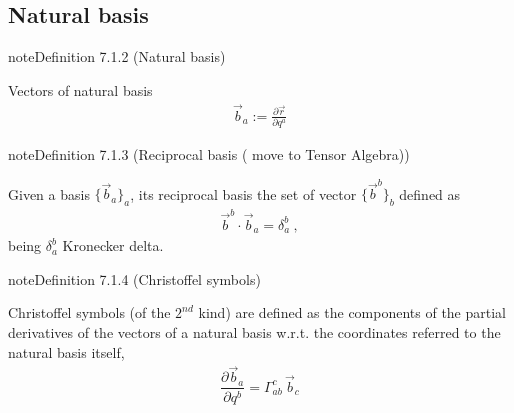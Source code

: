 \documentclass[letterpaper,10pt,english]{jupyterBook}
\begin{document}
\subsection{Natural basis}
\label{\detokenize{ch/tensor-algebra-calculus/calculus-euclidean:natural-basis}}\label{\detokenize{ch/tensor-algebra-calculus/calculus-euclidean:tensor-calculus-coordinates-natural-basis}}\label{ch/tensor-algebra-calculus/calculus-euclidean:definition-1}
\begin{sphinxadmonition}{note}{Definition 7.1.2 (Natural basis)}



\sphinxAtStartPar
Vectors of natural basis
\begin{equation*}
\begin{split}\vec{b}_a := \frac{\partial \vec{r}}{\partial q^a}\end{split}
\end{equation*}\end{sphinxadmonition}
\label{ch/tensor-algebra-calculus/calculus-euclidean:definition-2}
\begin{sphinxadmonition}{note}{Definition 7.1.3 (Reciprocal basis ( move to Tensor Algebra))}



\sphinxAtStartPar
Given a basis \(\{ \vec{b}_a \}_{a}\), its reciprocal basis the set of vector \(\{ \vec{b}^b \}_b\) defined as
\begin{equation*}
\begin{split}\vec{b}^b \cdot \vec{b}_a = \delta_{a}^b \ ,\end{split}
\end{equation*}
\sphinxAtStartPar
being \(\delta_a^b\) Kronecker delta.
\end{sphinxadmonition}
\label{ch/tensor-algebra-calculus/calculus-euclidean:definition-3}
\begin{sphinxadmonition}{note}{Definition 7.1.4 (Christoffel symbols)}



\sphinxAtStartPar
Christoffel symbols (of the \(2^{nd}\) kind) are defined as the components of the partial derivatives of the vectors of a natural basis w.r.t. the coordinates referred to the natural basis itself,
\begin{equation}\label{equation:ch/tensor-algebra-calculus/calculus-euclidean:def:christoffel:2}
\begin{split}\dfrac{\partial \vec{b}_a}{\partial q^b} = \Gamma_{ab}^c \, \vec{b}_c\end{split}
\end{equation}\end{sphinxadmonition}
\end{document}
